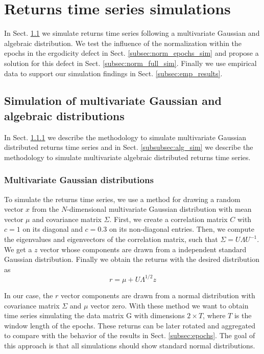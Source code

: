 \section{Returns time series simulations}
\label{sec:simulations}

In Sect. \ref{subsec:gauss_alg_sim} we simulate returns time series following
a multivariate Gaussian and algebraic distribution. We test the influence of
the normalization within the epochs in the ergodicity defect in Sect.
\ref{subsec:norm_epochs_sim} and propose a solution for this defect in Sect.
\ref{subsec:norm_full_sim}. Finally we use empirical data to support our
simulation findings in Sect. \ref{subsec:emp_results}.

\subsection{Simulation of multivariate Gaussian and algebraic distributions}
\label{subsec:gauss_alg_sim}

In Sect. \ref{subsubsec:gauss_sim} we describe the methodology to simulate
multivariate Gaussian distributed returns time series and in Sect.
\ref{subsubsec:alg_sim} we describe the methodology to simulate multivariate
algebraic distributed returns time series.

\subsubsection{Multivariate Gaussian distributions}\label{subsubsec:gauss_sim}

To simulate the returns time series, we use a method \cite{drawing_dist} for
drawing a random vector $x$ from the $N$-dimensional multivariate Gaussian
distribution with mean vector $\mu$ and covariance matrix $\Sigma$. First, we
create a correlation matrix $C$ with $c = 1$ on its diagonal and $c = 0.3$ on
its non-diagonal entries. Then, we compute the eigenvalues and eigenvectors
of the correlation matrix, such that $\Sigma = U \Lambda U^{-1}$. We get a $z$
vector whose components are drawn from a independent standard Gaussian
distribution. Finally we obtain the returns with the desired distribution as
\begin{equation}
    r = \mu + U \Lambda^{1/2} z
\end{equation}

In our case, the $r$ vector components are drawn from a normal distribution
with covariance matrix $\Sigma$ and $\mu$ vector zero.
With these method we want to obtain time series simulating the data matrix G
with dimensions $2 \times T$, where $T$ is the window length of the epochs.
These returns can be later rotated and aggregated to compare with the behavior
of the results in Sect. \ref{subsec:epochs}.
The goal of this approach is that all simulations should show standard normal
distributions.


